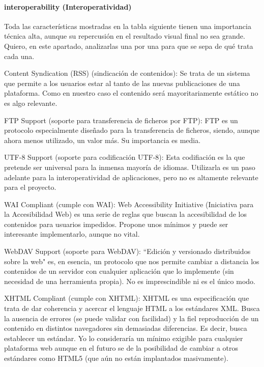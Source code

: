 \paragraph{interoperability (Interoperatividad)}

\par Toda las características mostradas en la tabla siguiente tienen una importancia técnica alta, aunque su repercusión en el resultado visual final no sea grande. Quiero, en este apartado, analizarlas una por una para que se sepa de qué trata cada una.

\par Content Syndication (RSS) (sindicación de contenidos): Se trata de un sistema que permite a los usuarios estar al tanto de las nuevas publicaciones de una plataforma. Como en nuestro caso el contenido será mayoritariamente estático no es algo relevante.

\par FTP Support (soporte para transferencia de ficheros por FTP): FTP es un protocolo especialmente diseñado para la transferencia de ficheros, siendo, aunque ahora menos utilizado, un valor más. Su importancia es media.

\par UTF-8 Support (soporte para codificación UTF-8): Esta codifiación es la que pretende ser universal para la inmensa mayoría de idiomas. Utilizarla es un paso adelante para la interoperatividad de aplicaciones, pero no es altamente relevante para el proyecto.

\par WAI Compliant (cumple con WAI): Web Accessibility Initiative (Iniciativa para la Accesibilidad Web) es una serie de reglas que buscan la accesibilidad de los contenidos para usuarios impedidos. Propone unos mínimos y puede ser interesante implementarlo, aunque no vital.

\par WebDAV Support (soporte para WebDAV): ``Edición y versionado distribuidos sobre la web" es, en esencia, un protocolo que nos permite cambiar a distancia los contenidos de un servidor con cualquier aplicación que lo implemente (sin necesidad de una herramienta propia). No es imprescindible ni es el único modo.

\par XHTML Compliant (cumple con XHTML): XHTML es una especificación que trata de dar coherencia y acercar el lenguaje HTML a los estándares XML. Busca la ausencia de errores (se puede validar con facilidad) y la fiel reproducción de un contenido en distintos navegadores sin demasiadas diferencias. Es decir, busca establecer un estándar. Yo lo consideraría un mínimo exigible para cualquier plataforma web aunque en el futuro se de la posibilidad de cambiar a otros estándares como HTML5 (que aún no están implantados masivamente).


